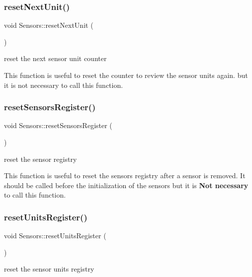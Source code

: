 \subsubsection{\texorpdfstring{reset\+Next\+Unit()}{resetNextUnit()}}
{\footnotesize\ttfamily void Sensors\+::reset\+Next\+Unit (\begin{DoxyParamCaption}{ }\end{DoxyParamCaption})}



reset the next sensor unit counter 

This function is useful to reset the counter to review the sensor units again. but it is not necessary to call this function. \mbox{\label{classSensors_a86190ba0e2fce178aaf936d2c926f7fe}} 
\subsubsection{\texorpdfstring{reset\+Sensors\+Register()}{resetSensorsRegister()}}
{\footnotesize\ttfamily void Sensors\+::reset\+Sensors\+Register (\begin{DoxyParamCaption}{ }\end{DoxyParamCaption})}



reset the sensor registry 

This function is useful to reset the sensors registry after a sensor is removed. It should be called before the initialization of the sensors but it is {\bfseries Not necessary} to call this function. \mbox{\label{classSensors_a47635ad00b96b1175c96c6ead2c4a514}} 
\subsubsection{\texorpdfstring{reset\+Units\+Register()}{resetUnitsRegister()}}
{\footnotesize\ttfamily void Sensors\+::reset\+Units\+Register (\begin{DoxyParamCaption}{ }\end{DoxyParamCaption})}



reset the sensor units registry 

